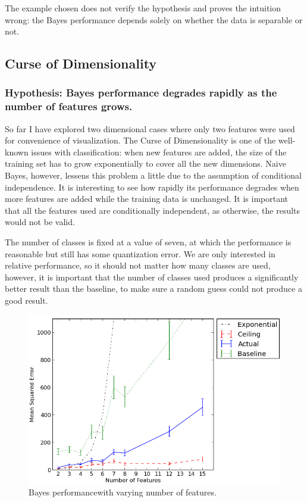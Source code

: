 \documentclass[12pt,a4paper,notitlepage,twoside]{scrbook}
\begin{document}
The example chosen does not verify the hypothesis and proves the intuition wrong: the
Bayes performance depends solely on whether the data is separable or not.

\subsection{Curse of Dimensionality}
\subsubsection*{Hypothesis: Bayes performance degrades rapidly as the number of features grows.}
So far I have explored two dimensional cases where only two features were used for
convenience of visualization. The Curse of Dimensionality is one of the well-known issues with
classification: when new features are added, the size of the training set has to grow
exponentially to cover all the new dimensions. Naive Bayes, however, lessens this problem
a little due to the assumption of conditional independence. It is interesting to see how
rapidly its performance degrades when more features are added while the training data is
unchanged. It is important that all the features used are conditionally independent, as
otherwise, the results would not be valid. 

The number of classes is fixed at a value of seven, at which the performance is
reasonable but still has some quantization error. We are only interested in
relative performance, so it should not matter how many classes are used,
however, it is important that the number of classes used produces a
significantly better result than the baseline, to make sure a random guess
could not produce a good result.

\begin{figure}[h!]
  \centering
  \includegraphics[width=0.8\linewidth]{figs/feats.png}
  \caption{Bayes performancewith varying number of features.\label{feats}}
\end{figure}
\end{document}
